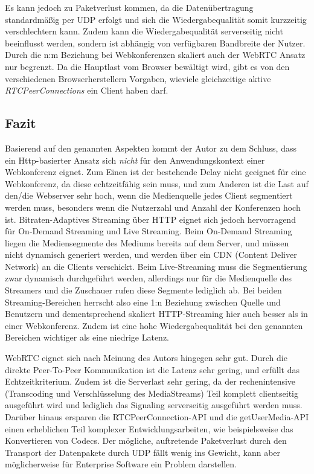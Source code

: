 Es kann jedoch zu Paketverlust kommen, da die Datenübertragung standardmäßig per UDP erfolgt und sich die Wiedergabequalität somit kurzzeitig verschlechtern
kann\parencite[14. Accessibility Considerations]{W3WebRTC}.
Zudem kann die Wiedergabequalität serverseitig nicht beeinflusst werden, sondern ist abhängig von verfügbaren Bandbreite der Nutzer.
Durch die n:m Beziehung bei Webkonferenzen skaliert auch der WebRTC Ansatz nur begrenzt.
Da die Hauptlast vom Browser bewältigt wird, gibt es von den verschiedenen Browserherstellern Vorgaben, wieviele gleichzeitige aktive \textit{RTCPeerConnections}
ein Client haben darf.

\subsection{Fazit}
\label{subsec:Fazit}
Basierend auf den genannten Aspekten kommt der Autor zu dem Schluss, dass ein Http-basierter Ansatz sich \textit{nicht} für den Anwendungskontext einer Webkonferenz
eignet.
Zum Einen ist der bestehende Delay nicht geeignet für eine Webkonferenz, da diese echtzeitfähig sein muss, und zum Anderen ist die Last auf den/die Webserver sehr hoch,
wenn die Medienquelle jedes Client segmentiert werden muss, besonders wenn die Nutzerzahl und Anzahl der Konferenzen hoch ist.
Bitraten-Adaptives Streaming über HTTP eignet sich jedoch hervorragend für On-Demand Streaming und Live Streaming.
Beim On-Demand Streaming liegen die Mediensegmente des Mediums bereits auf dem Server, und müssen nicht dynamisch generiert werden,
und werden über ein CDN (Content Deliver Network) an die Clients verschickt.
Beim Live-Streaming muss die Segmentierung zwar dynamisch durchgeführt werden, allerdings nur für die Medienquelle des Streamers und die Zuschauer
rufen diese Segmente lediglich ab.
Bei beiden Streaming-Bereichen herrscht also eine 1:n Beziehung zwischen Quelle und Benutzern und dementsprechend skaliert HTTP-Streaming hier auch besser
als in einer Webkonferenz.
Zudem ist eine hohe Wiedergabequalität bei den genannten Bereichen wichtiger als eine niedrige Latenz.

WebRTC eignet sich nach Meinung des Autors hingegen sehr gut.
Durch die direkte Peer-To-Peer Kommunikation ist die Latenz sehr gering, und erfüllt das Echtzeitkriterium.
Zudem ist die Serverlast sehr gering, da der rechenintensive (Transcoding und Verschlüsselung des MediaStreams) Teil komplett clientseitig ausgeführt wird
und lediglich das Signaling serverseitig ausgeführt werden muss.
Darüber hinaus ersparen die RTCPeerConnection-API und die getUserMedia-API einen erheblichen Teil komplexer Entwicklungsarbeiten, wie beispielsweise das Konvertieren
von Codecs.
Der mögliche, auftretende Paketverlust durch den Transport der Datenpakete durch UDP fällt wenig ins Gewicht, kann aber möglicherweise für Enterprise Software
ein Problem darstellen.


